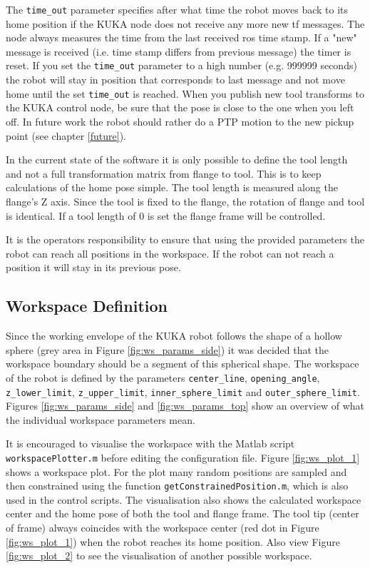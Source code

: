 \documentclass[headsepline,footinclude=false,fontsize=11pt,paper=a4,listof=totoc,bibliography=totoc,BCOR=12mm,DIV=14]{scrbook}
\begin{document}
The \texttt{time\_out} parameter specifies after what time the robot moves back to its home position if the KUKA node does not receive any more new tf messages. The node always measures the time from the last received \gls{ros} time stamp. If a "new" message is received (i.e. time stamp differs from previous message) the timer is reset. If you set the \texttt{time\_out} parameter to a high number (e.g. 999999 seconds) the robot will stay in position that corresponds to last message and not move home until the set \texttt{time\_out} is reached. When you publish new tool transforms to the KUKA control node, be sure that the pose is close to the one when you left off. In future work the robot should rather do a PTP motion to the new pickup point (see chapter \ref{future}). 

In the current state of the software it is only possible to define the tool length and not a full transformation matrix from flange to tool. This is to keep calculations of the home pose simple. The tool length is measured along the flange's Z axis. Since the tool is fixed to the flange, the rotation of flange and tool is identical. If a tool length of 0 is set the flange frame will be controlled.

It is the operators responsibility to ensure that using the provided parameters the robot can reach all positions in the workspace. If the robot can not reach a position it will stay in its previous pose. 

\subsection{Workspace Definition}\label{ws_def}

Since the working envelope of the KUKA robot follows the shape of a hollow sphere (grey area in Figure \ref{fig:ws_params_side}) it was decided that the workspace boundary should be a segment of this spherical shape. The workspace of the robot is defined by the parameters \texttt{center\_line}, \texttt{opening\_angle}, \texttt{z\_lower\_limit}, \texttt{z\_upper\_limit}, \texttt{inner\_sphere\_limit} and \texttt{outer\_sphere\_limit}. Figures \ref{fig:ws_params_side} and \ref{fig:ws_params_top} show an overview of what the individual workspace parameters mean.

It is encouraged to visualise the workspace with the Matlab script \texttt{workspacePlotter.m} before editing the configuration file. Figure \ref{fig:ws_plot_1} shows a workspace plot. For the plot many random positions are sampled and then constrained using the function \texttt{getConstrainedPosition.m}, which is also used in the control scripts. The visualisation also shows the calculated workspace center and the home pose of both the tool and flange frame. The tool tip (center of frame) always coincides with the workspace center (red dot in Figure \ref{fig:ws_plot_1}) when the robot reaches its home position. Also view Figure \ref{fig:ws_plot_2} to see the visualisation of another possible workspace.
\end{document}
